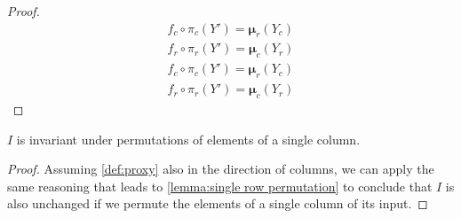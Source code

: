 \begin{appendices}
\begin{proof}
\begin{align*}
    f_c \circ \pi_c (Y') = \pmb{\mu}_r (Y_c)\\
    f_r \circ \pi_r (Y') = \pmb{\mu}_c (Y_r)\\
    f_c \circ \pi_c (Y') = \pmb{\mu}_r (Y_c)\\
    f_r \circ \pi_r (Y') = \pmb{\mu}_c (Y_r)
\end{align*}
%
\end{proof}

\begin{lemma}
    \label{lemma:single col permutation}
    $I$ is invariant under permutations of elements of a single column.
\end{lemma}
\begin{proof}
Assuming \cref{def:proxy} also in the direction of columns, we can apply the same reasoning that leads to \cref{lemma:single row permutation} to conclude that $I$ is also unchanged if we permute the elements of a single column of its input.
\end{proof}


\end{appendices}
